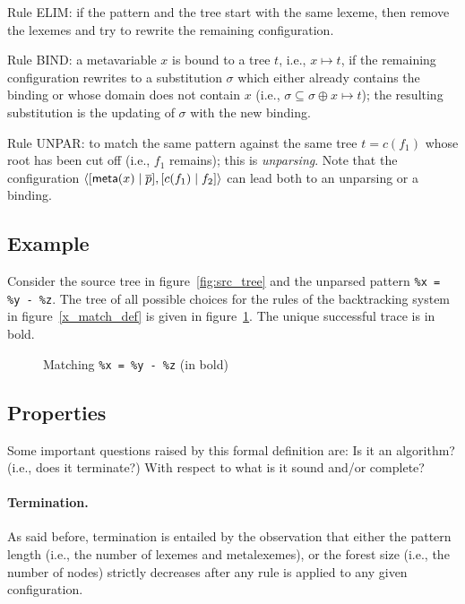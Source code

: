 Rule \textsf{ELIM}: if the pattern and the tree start with the same
lexeme, then remove the lexemes and try to rewrite the remaining
configuration.

Rule \textsf{BIND}: a meta\-variable \(x\) is bound to a tree \(t\),
i.e., \(x \mapsto t\), if the remaining configuration rewrites to a
substitution \(\sigma\) which either already contains the binding or
whose domain does not contain \(x\) (i.e., \(\sigma \subseteq \sigma
\oplus x \mapsto t\)); the resulting substitution is the updating of
\(\sigma\) with the new binding.

Rule \textsf{UNPAR}: to match the same pattern against the same tree
\(t = c(f_1)\) whose root has been cut off (i.e., \(f_1\) remains);
this is \emph{unparsing}. Note that the configuration
\(\smat{\cons{c(f_1)}{f_2}}{\cons{\meta{x}}{\overline{p}}}\) can lead
both to an unparsing or a binding.

\subsection{Example}

Consider the source tree in figure~\ref{fig:src_tree} and the unparsed
pattern \texttt{\%x = \%y - \%z}. The tree of all possible choices for
the rules of the backtracking system in figure~\ref{x_match_def} is
given in figure~\ref{fig:backtracking_example}. The unique successful
trace is in bold.
\begin{figure}[H]
\caption{Matching \texttt{\%x = \%y - \%z} (in bold)}
\label{fig:backtracking_example}
\end{figure}


\subsection{Properties}

Some important questions raised by this formal definition are: Is it
an algorithm? (i.e., does it terminate?) With respect to what is it
sound and/or complete?

\paragraph{Termination.} 

As said before, termination is entailed by the observation that either
the pattern length (i.e., the number of lexemes and meta\-lexemes), or
the forest size (i.e., the number of nodes) strictly decreases after
any rule is applied to any given configuration.

